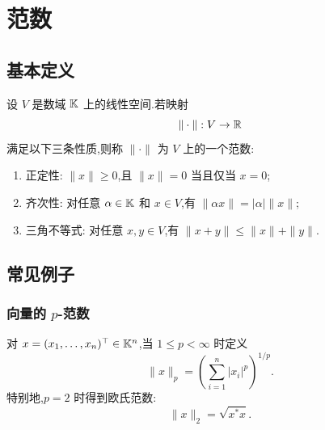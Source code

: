 \section{范数}


\subsection{基本定义}

设 $V$ 是数域 $\mathbb{K}$ 上的线性空间.若映射
\[
    \|\cdot\|:V\to\mathbb{R}
\]
满足以下三条性质,则称 $\|\cdot\|$ 为 $V$ 上的一个范数:
\begin{enumerate}
    \item 正定性: $\|x\|\ge 0$,且 $\|x\|=0$ 当且仅当 $x=0$;
    \item 齐次性: 对任意 $\alpha\in\mathbb{K}$ 和 $x\in V$,有 $\|\alpha x\|=|\alpha|\|x\|$;
    \item 三角不等式: 对任意 $x,y\in V$,有 $\|x+y\|\le \|x\|+\|y\|$.
\end{enumerate}

\subsection{常见例子}

\subsubsection{向量的 \texorpdfstring{$p$}{p}-范数}

对 $x=(x_1,\dots,x_n)^\top\in\mathbb{K}^n$,当 $1\le p<\infty$ 时定义
\[
    \|x\|_p=\left(\sum_{i=1}^n |x_i|^p\right)^{1/p}.
\]
特别地,$p=2$ 时得到欧氏范数:
\[
    \|x\|_2=\sqrt{x^\ast x}.
\]

